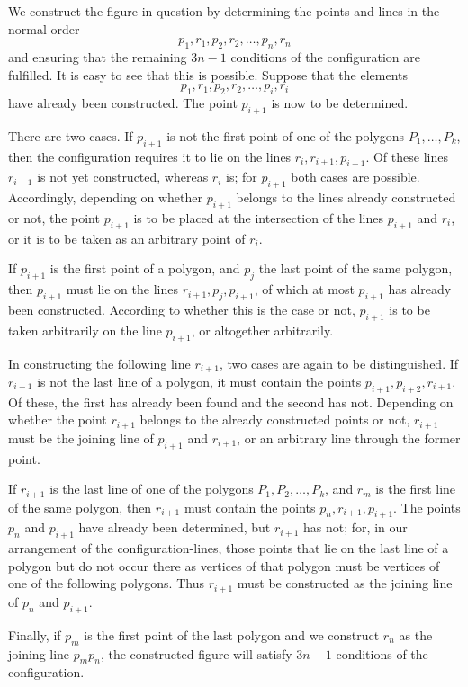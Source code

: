 \documentclass[11pt]{article}
\begin{document}
We construct the figure in question by determining the points and lines in the normal order
\[
p_1,r_1,p_2,r_2,\ldots,p_n,r_n
\]
and ensuring that the remaining $3n-1$ conditions of the configuration are fulfilled. It is easy to see that this is possible. Suppose that the elements
\[
p_1,r_1,p_2,r_2,\ldots,p_i,r_i
\]
have already been constructed. The point $p_{i+1}$ is now to be determined.

There are two cases. If $p_{i+1}$ is not the first point of one of the polygons $P_1,\ldots,P_k$, then the configuration requires it to lie on the lines $r_i,r_{i+1},p_{i+1}$. Of these lines $r_{i+1}$ is not yet constructed, whereas $r_i$ is; for $p_{i+1}$ both cases are possible. Accordingly, depending on whether $p_{i+1}$ belongs to the lines already constructed or not, the point $p_{i+1}$ is to be placed at the intersection of the lines $p_{i+1}$ and $r_i$, or it is to be taken as an arbitrary point of $r_i$.

If $p_{i+1}$ is the first point of a polygon, and $p_j$ the last point of the same polygon, then $p_{i+1}$ must lie on the lines $r_{i+1},p_j,p_{i+1}$, of which at most $p_{i+1}$ has already been constructed. According to whether this is the case or not, $p_{i+1}$ is to be taken arbitrarily on the line $p_{i+1}$, or altogether arbitrarily.

In constructing the following line $r_{i+1}$, two cases are again to be distinguished. If $r_{i+1}$ is not the last line of a polygon, it must contain the points $p_{i+1},p_{i+2},r_{i+1}$. Of these, the first has already been found and the second has not. Depending on whether the point $r_{i+1}$ belongs to the already constructed points or not, $r_{i+1}$ must be the joining line of $p_{i+1}$ and $r_{i+1}$, or an arbitrary line through the former point.

If $r_{i+1}$ is the last line of one of the polygons $P_1,P_2,\ldots,P_k$, and $r_m$ is the first line of the same polygon, then $r_{i+1}$ must contain the points $p_n,r_{i+1},p_{i+1}$. The points $p_n$ and $p_{i+1}$ have already been determined, but $r_{i+1}$ has not; for, in our arrangement of the configuration-lines, those points that lie on the last line of a polygon but do not occur there as vertices of that polygon must be vertices of one of the following polygons. Thus $r_{i+1}$ must be constructed as the joining line of $p_n$ and $p_{i+1}$.

Finally, if $p_m$ is the first point of the last polygon and we construct $r_n$ as the joining line $p_m p_n$, the constructed figure will satisfy $3n-1$ conditions of the configuration.
\end{document}
